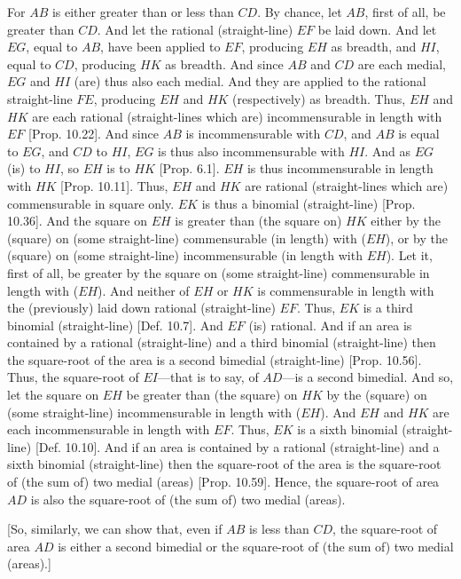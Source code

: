 \begin{Parallel}{}{}
{For $AB$ is either greater than or less than $CD$. By chance, let $AB$,
first of all,  be greater than $CD$. And let the rational (straight-line)
$EF$ be laid down. And let $EG$, equal to $AB$, have been applied
to $EF$, producing $EH$ as breadth, and $HI$, equal to $CD$, producing
$HK$ as breadth. And since $AB$ and $CD$ are each medial,
$EG$ and $HI$ (are) thus also each medial. And they are applied to
the rational straight-line $FE$, producing $EH$ and $HK$ (respectively) as breadth. Thus, $EH$ and $HK$ are  each rational (straight-lines which are) incommensurable in length with $EF$ [Prop. 10.22]. And since $AB$ is incommensurable
with $CD$, and $AB$ is equal to $EG$, and $CD$ to $HI$, $EG$
is thus also incommensurable with $HI$. And as $EG$ (is) to $HI$,
so $EH$ is to $HK$ [Prop. 6.1].  $EH$ is thus
incommensurable in length with $HK$ [Prop. 10.11]. Thus, $EH$ and $HK$ are rational
(straight-lines which are) commensurable in square only. $EK$
is thus a binomial (straight-line) [Prop. 10.36]. 
And the square on $EH$ is  greater than (the square on) $HK$
either by the (square) on (some straight-line) commensurable (in length) with ($EH$), or
by the (square) on (some straight-line) incommensurable (in length
with $EH$). Let it, first of all, be greater by the square on (some
straight-line) commensurable in length with ($EH$). And neither of
$EH$ or $HK$ is commensurable in length with the (previously)
laid down rational (straight-line) $EF$.  Thus, $EK$ is a third
binomial (straight-line) [Def. 10.7]. And $EF$
(is) rational. And if an area is contained by a rational (straight-line) and
a third binomial (straight-line)  then the square-root of the area
is a second bimedial  (straight-line) [Prop. 10.56]. Thus,
the square-root of $EI$---that is to say, of $AD$---is a second bimedial.
And so, let the square on $EH$ be greater than (the square) on $HK$
by the (square)  on (some straight-line) incommensurable in length
with ($EH$).  And $EH$ and $HK$
are each incommensurable
in length with $EF$. Thus, $EK$ is a sixth binomial (straight-line)
[Def. 10.10]. And if an area
is contained by
a rational (straight-line) and a sixth binomial (straight-line)  then the square-root of the area is the square-root of (the sum of) two medial (areas) 
[Prop. 10.59]. Hence, the
square-root of area $AD$ is also the square-root of (the sum of)
two medial (areas).

\mbox{[}So, similarly, we can show that, even if $AB$ is less than $CD$, the
square-root of area $AD$ is either a second bimedial or the square-root
of (the sum of) two medial (areas).]

}
\end{Parallel}
